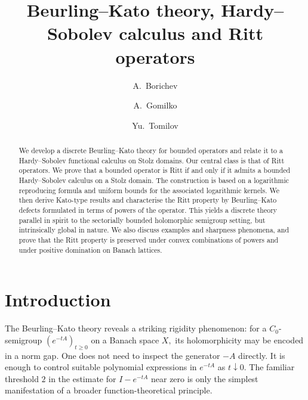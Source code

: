 \documentclass[11pt]{amsart}
\title[Beurling--Kato theory]{Beurling--Kato theory, Hardy--Sobolev calculus and Ritt operators}
\author{A.~Borichev}
\author{A.~Gomilko}
\author{Yu.~Tomilov}
\numberwithin{equation}{section}
\theoremstyle{definition}
\theoremstyle{plain}
\begin{document}
\begin{abstract}
We develop a discrete Beurling--Kato theory for bo\-und\-ed operators and relate it to a Hardy--Sobolev functional calculus on Stolz domains. Our central class is that of Ritt operators. We prove that a bounded operator is Ritt if and only if it admits a bounded Hardy--Sobolev calculus on a Stolz domain. The construction is based on a logarithmic reproducing formula and uniform bounds for the associated logarithmic kernels.
We then derive Kato-type results and characterise the Ritt property by Beurling--Kato defects formulated in terms of powers of the operator. This yields a discrete theory parallel in spirit to the sectorially bounded holomorphic semigroup setting, but intrinsically global in nature.
We also discuss examples and sharpness phenomena, and prove that the
Ritt property is preserved under convex combinations of powers and
under positive domination on Banach lattices.
\end{abstract}

\maketitle

\setcounter{tocdepth}{1}
\tableofcontents

\section{Introduction}\label{sec:introduction}

The Beurling--Kato theory reveals a striking rigidity phenomenon: for 
a $C_0$-semigroup $(e^{-tA})_{t \ge 0}$ on a Banach space $X,$ its holomorphicity may be encoded in a norm gap. One does
not need to inspect the generator $-A$ directly. It is enough to control suitable
polynomial expressions in $e^{-tA}$ as $t\downarrow0$. The familiar threshold $2$
in the estimate for $I-e^{-tA}$ near zero is only the simplest manifestation of a broader
function-theoretical principle.
\end{document}
